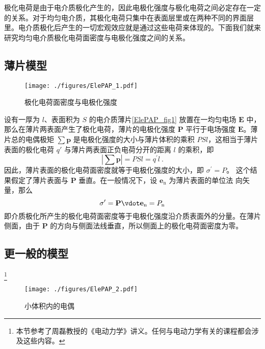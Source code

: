 


极化电荷是由于电介质极化产生的，因此电极化强度与极化电荷之间必定存在一定的关系。对于均匀电介质，其极化电荷只集中在表面层里或在两种不同的界面层里。电介质极化后产生的一切宏观效应就是通过这些电荷来体现的。下面我们就来研究均匀电介质极化电荷面密度与电极化强度之间的关系。

\subsection{薄片模型}
\begin{figure}[ht]
\centering
\texttt{[image: ./figures/ElePAP\_1.pdf]}
\caption{极化电荷面密度与电极化强度} \label{ElePAP_fig1}
\end{figure}
设有一厚为 $l$、表面积为 $S $ 的电介质薄片\autoref{ElePAP_fig1} 放置在一均匀电场 $\mathbf E $ 中，那么在薄片两表面产生了极化电荷，薄片的电极化强度 $\mathbf P $ 平行于电场强度 $\mathbf E$。薄片总的电偶极矩 $\sum \mathbf p$ 是电极化强度的大小与薄片体积的乘积 $PSl$，这相当于薄片表面的极化电荷 $q' $ 与薄片两表面正负电荷分开的距离 $l $ 的乘积，即
\begin{equation}
\left|\sum \mathbf p\right|=P S l=q^{\prime} l~.
\end{equation}
因此，薄片表面的极化电荷面密度就等于电极化强度的大小，即 $\sigma^{\prime}=P$。
这个结果假定了薄片表面与 $\mathbf P $ 垂直。在一般情况下，设 $\mathbf e_\mathrm{n} $ 为薄片表面的单位法
向矢量，那么
\begin{equation}
\sigma^{\prime}=\mathbf P \vdot \mathbf e_{\mathrm{n}}=P_{\mathrm{n}}
\end{equation}
即介质极化所产生的极化电荷面密度等于电极化强度沿介质表面外的分量。在薄片侧面，由于 $\mathbf P $ 的方向与侧面法线垂直，所以侧面上的极化电荷面密度为零。

\subsection{更一般的模型}
\footnote{本节参考了周磊教授的《电动力学》讲义。任何与电动力学有关的课程都会涉及这些内容。}
\begin{figure}[ht]
\centering
\texttt{[image: ./figures/ElePAP\_2.pdf]}
\caption{小体积内的电偶} \label{ElePAP_fig2}
\end{figure}

